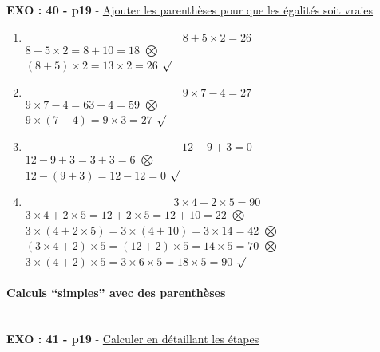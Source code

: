\documentclass[11pt]{article}
\begin{document}
\textbf{EXO : 40 - p19} - \underline{Ajouter les parenthèses pour que les égalités soit vraies}
\begin{enumerate}
\item $$8 + 5 \times 2 = 26 $$
  $8 + 5 \times 2 = 8 + 10 = 18 $ $\bigotimes$\\  
  $(8 + 5) \times 2 =  13 \times 2 = 26$ $\surd$

\item $$9 \times 7 - 4 = 27$$
  $9 \times 7 - 4 = 63 - 4 = 59$ $\bigotimes$\\
  $9 \times (7 - 4) = 9 \times 3 = 27$  $\surd$

\item $$12 - 9 + 3 = 0$$
  $12 - 9 + 3 = 3 + 3 = 6$ $\bigotimes$\\
  $12 - (9 + 3) = 12 - 12 = 0$ $\surd$

\item $$3 \times 4 + 2 \times 5 = 90$$
  $3 \times 4 + 2 \times 5 = 12 + 2 \times 5 = 12 + 10 = 22$  $\bigotimes$ \\
  $3 \times (4 + 2 \times 5) = 3 \times (4 + 10) = 3 \times 14 = 42$  $\bigotimes$\\
  $(3 \times 4 + 2) \times 5 = (12 + 2) \times 5 = 14 \times 5 = 70$ $\bigotimes$\\
  $3 \times (4 + 2) \times 5 = 3 \times 6 \times 5 = 18 \times 5 = 90$  $\surd$

\end{enumerate}

\paragraph{Calculs ``simples'' avec des parenthèses}~~\\

\textbf{EXO : 41 - p19} - \underline{Calculer en détaillant les étapes}
\end{document}
